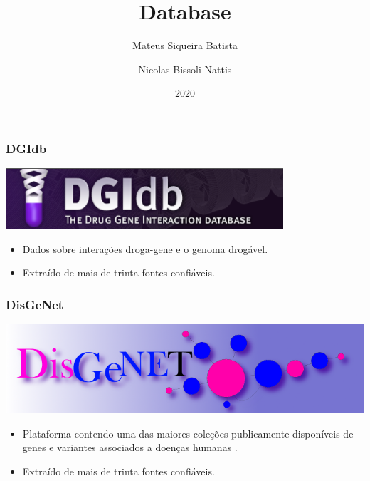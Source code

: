 \documentclass[12pt]{beamer}
\title[Database]{Database}
\author{
  Mateus Siqueira Batista\and
  Nicolas Bissoli Nattis
}
\institute{
  MC536 - Instituto de Computação, UNICAMP
}
\date[2020]{2020}
\begin{document}
\frame{\titlepage}



\begin{frame}
  \frametitle{DGIdb}
  \includegraphics[scale=0.8]{dgi.png}
  \begin{itemize}
    \item {Dados sobre interações droga-gene e o genoma drogável.}
    \item {Extraído de mais de trinta fontes confiáveis.}
  \end{itemize}
\end{frame} 

\begin{frame}
  \frametitle{DisGeNet}
  \includegraphics[scale=0.425]{disgenet.png}
  \begin{itemize}
    \item {Plataforma contendo uma das maiores coleções publicamente disponíveis de genes e variantes associados a doenças humanas
    .}
    \item {Extraído de mais de trinta fontes confiáveis.}
  \end{itemize}
\end{frame} 
\end{document}
